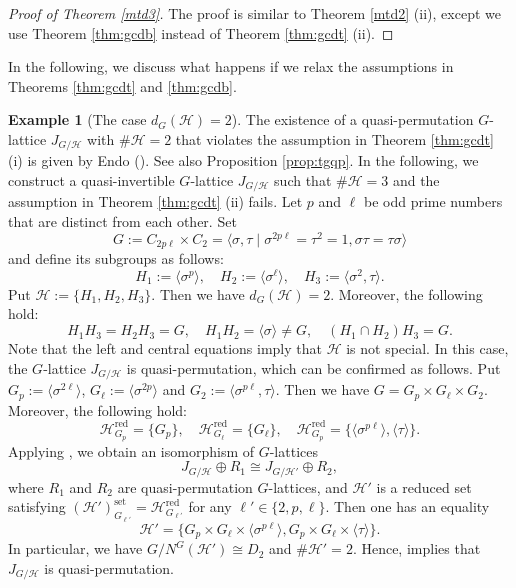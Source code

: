 \documentclass[12pt]{amsart}
\theoremstyle{plain}
\theoremstyle{definition}
\newtheorem{ex}[thm]{Example}
\numberwithin{thm}{section}
\numberwithin{equation}{section}
\newcommand{\cH}{\mathcal{H}}
\DeclareMathOperator{\red}{red}
\DeclareMathOperator{\set}{set}
\begin{document}
\begin{proof}[Proof of Theorem \ref{mtd3}]
The proof is similar to Theorem \ref{mtd2} (ii), except we use Theorem \ref{thm:gcdb} instead of Theorem \ref{thm:gcdt} (ii). 
\end{proof}

In the following, we discuss what happens if we relax the assumptions in Theorems \ref{thm:gcdt} and \ref{thm:gcdb}. 

\begin{ex}[{The case $d_{G}(\cH)=2$}]
The existence of a quasi-permutation $G$-lattice $J_{G/\cH}$ with $\#\cH=2$ that violates the assumption in Theorem \ref{thm:gcdt} (i) is given by Endo (\cite{Endo2001}). See also Proposition \ref{prop:tgqp}. In the following, we construct a quasi-invertible $G$-lattice $J_{G/\cH}$ such that $\#\cH=3$ and the assumption in Theorem \ref{thm:gcdt} (ii) fails. Let $p$ and $\ell$ be odd prime numbers that are distinct from each other. Set 
\begin{equation*}
    G:=C_{2p\ell} \times C_{2}=\langle \sigma,\tau \mid \sigma^{2p\ell}=\tau^{2}=1,\sigma\tau=\tau\sigma\rangle
\end{equation*}
and define its subgroups as follows: 
\begin{equation*}
    H_{1}:=\langle \sigma^{p} \rangle,\quad H_{2}:=\langle\sigma^{\ell} \rangle,\quad
    H_{3}:=\langle \sigma^{2}, \tau \rangle. 
\end{equation*}
Put $\cH:=\{H_{1},H_{2},H_{3}\}$. Then we have $d_{G}(\cH)=2$. Moreover, the following hold: 
\begin{equation*}
    H_{1}H_{3}=H_{2}H_{3}=G,\quad H_{1}H_{2}=\langle \sigma \rangle\neq G,\quad (H_{1}\cap H_{2})H_{3}=G. 
\end{equation*}
Note that the left and central equations imply that $\cH$ is not special. In this case, the $G$-lattice $J_{G/\cH}$ is quasi-permutation, which can be confirmed as follows. Put $G_{p}:=\langle \sigma^{2\ell}\rangle$, $G_{\ell}:=\langle \sigma^{2p}\rangle$ and $G_{2}:=\langle \sigma^{p\ell},\tau \rangle$. Then we have $G=G_{p}\times G_{\ell} \times G_{2}$. Moreover, the following hold: 
\begin{equation*}
    \cH_{G_{p}}^{\red}=\{G_{p}\},\quad \cH_{G_{\ell}}^{\red}=\{G_{\ell}\},\quad \cH_{G_{p}}^{\red}=\{\langle \sigma^{p\ell}\rangle,\langle \tau \rangle\}. 
\end{equation*}
Applying \cite[Lemma 9.1]{Hasegawa}, we obtain an isomorphism of $G$-lattices
\begin{equation*}
    J_{G/\cH}\oplus R_{1}\cong J_{G/\cH'}\oplus R_{2}, 
\end{equation*}
where $R_{1}$ and $R_{2}$ are quasi-permutation $G$-lattices, and $\cH'$ is a reduced set satisfying $(\cH')_{G_{\ell'}}^{\set}=\cH_{G_{\ell'}}^{\red}$ for any $\ell'\in \{2,p,\ell\}$. Then one has an equality
\begin{equation*}
    \cH'=\{G_{p}\times G_{\ell}\times \langle \sigma^{p\ell}\rangle, G_{p}\times G_{\ell}\times \langle \tau \rangle\}. 
\end{equation*}
In particular, we have $G/N^{G}(\cH')\cong D_{2}$ and $\#\cH'=2$. Hence, \cite[Theorem 9.2]{Hasegawa} implies that $J_{G/\cH}$ is quasi-permutation. 
\end{ex}
\end{document}
